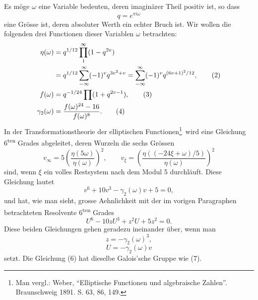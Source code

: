 \documentclass[11pt]{article}
\begin{document}
Es möge \(\omega\) eine Variable bedeuten, deren imaginärer Theil positiv ist, so dass
\begin{equation}
q=e^{\pi i\omega}
\tag{1}
\end{equation}
eine Grösse ist, deren absoluter Werth ein echter Bruch ist. Wir wollen die folgenden drei Functionen dieser Variablen \(\omega\) betrachten:
\begin{align}
\eta(\omega)&=q^{1/12}\prod_{1}^{\infty}(1-q^{2v})\notag\\
&=q^{1/12}\sum_{-\infty}^{\infty}(-1)^v q^{3v^2+v}
=\sum_{-\infty}^{\infty}(-1)^v q^{(6v+1)^2/12},\tag{2}\\
f(\omega)&=q^{-1/24}\prod(1+q^{2v-1}),\tag{3}\\
\gamma_2(\omega)&=\frac{f(\omega)^{24}-16}{f(\omega)^8}.\tag{4}
\end{align}
In der Transformationstheorie der elliptischen Functionen\footnote{Man vergl.: Weber, ``Elliptische Functionen und algebraische Zahlen''. Braunschweig 1891. S. 63, 86, 149.}\ wird eine Gleichung 6\textsuperscript{ten} Grades abgeleitet, deren Wurzeln die sechs Grössen
\begin{equation}
v_\infty=5\left(\frac{\eta(5\omega)}{\eta(\omega)}\right)^2,
\qquad
v_\xi=\left(\frac{\eta((-24\xi+\omega)/5)}{\eta(\omega)}\right)^2
\tag{5}
\end{equation}
sind, wenn \(\xi\) ein volles Restsystem nach dem Modul 5 durchläuft. Diese Gleichung lautet
\begin{equation}
v^6+10v^3-\gamma_2(\omega)v+5=0,
\tag{6}
\end{equation}
und hat, wie man sieht, grosse Aehnlichkeit mit der im vorigen Paragraphen betrachteten Resolvente 6\textsuperscript{ten} Grades
\begin{equation}
U^6-10zU^3+z^2U+5z^2=0.
\tag{7}
\end{equation}
Diese beiden Gleichungen gehen geradezu ineinander über, wenn man
\begin{equation}
z=-\gamma_2(\omega)^3,
\tag{8}
\end{equation}
\begin{equation}
U=-\gamma_2(\omega)v
\tag{9}
\end{equation}
setzt. Die Gleichung (6) hat dieselbe Galois'sche Gruppe wie (7).
\end{document}
